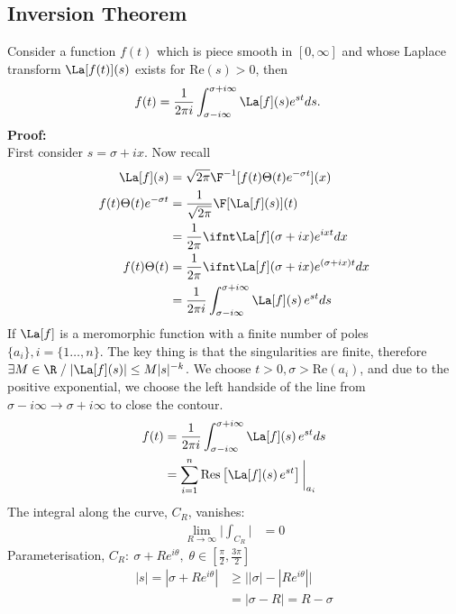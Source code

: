 \documentclass[cplx.tex]{subfiles}
\begin{document}
\subsection{Inversion Theorem}
Consider a function $f(t)$ which is piece smooth in $[0,\infty]$ and whose Laplace transform $\La[f(t)](s)$ exists for $\text{Re}(s)>0$, then
\begin{align}
    f(t) &= \frac{1}{2\pi i} \int_{\sigma-i\infty}^{\sigma+i\infty} \La[f](s)e^{st}ds.
\end{align}
\textbf{Proof:}\\
First consider $s=\sigma+ix$.
Now recall
\begin{align}
    \La[f](s) &= \sqrt{2\pi}\F^{-1}[f(t)\Theta(t)e^{-\sigma t}](x) \\
    f(t)\Theta(t)e^{-\sigma t} &= \frac{1}{\sqrt{2\pi}} \F[\La[f](s)](t) \\
                               &= \frac{1}{2\pi} \ifnt \La[f](\sigma + ix)e^{ixt}dx \\
    f(t)\Theta(t) &= \frac{1}{2\pi} \ifnt \La[f](\sigma+ix)e^{(\sigma+ix)t}dx \\
                  &= \frac{1}{2\pi i} \int_{\sigma-i\infty}^{\sigma+i\infty} \La[f](s)\,e^{st}ds
\end{align}
If $\La[f]$ is a meromorphic function with a finite number of poles $\{a_i\},i=\{1\dots,n\}$.
The key thing is that the singularities are finite, therefore $\exists M \in \R \; / \; |\La[f](s)| \leq M|s|^{-k}$.
We choose $t>0,\sigma>\text{Re}(a_i)$, and due to the positive exponential, we choose the left handside of the line from $\sigma-i\infty \to \sigma+i\infty$ to close the contour.
\begin{align}
    f(t) &= \frac{1}{2\pi i} \int_{\sigma-i\infty}^{\sigma+i\infty} \La[f](s)\,e^{st}ds \\
         &= \sum_{i=1}^n \text{Res}\left[\La[f](s)\,e^{st}\right]\bigg|_{a_i}
\end{align}
The integral along the curve, $C_R$, vanishes:
\begin{align}
    \lim_{R\to\infty} \Bigg|\int_{C_R}\Bigg| &= 0
\end{align}
Parameterisation, $C_R:~ \sigma + Re^{i\theta},\; \theta \in \left[\frac{\pi}{2},\frac{3\pi}{2}\right]$
\begin{align}
    |s| = |\sigma + Re^{i\theta}| &\geq \big| |\sigma| - |Re^{i\theta}|\big| \\
                                  &= |\sigma - R| = R-\sigma
\end{align}
\end{document}
